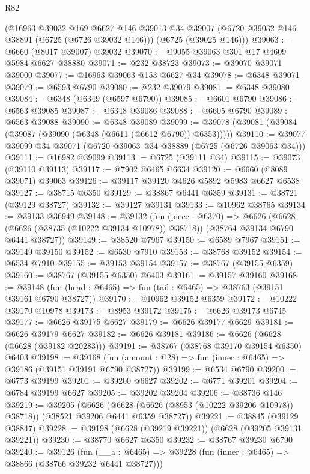 \begin{lexlean}{R82}
\begin{coremodule}
    (@16963
      @39032
      @169
      @6627
      @146
      @39013
      @34
      @39007
      (@6720 @39032 @146 @38891 (@6725 (@6726 @39032 @146)))
      (@6725 (@39025 @146)))
@39063 := @6660 (@8017 @39007) @39032
@39070 := @9055 @39063 @301 @17 @4609 @5984 @6627 @38880
@39071 := @232 @38723
@39073 := @39070 @39071 @39000
@39077 := @16963 @39063 @153 @6627 @34
@39078 := @6348 @39071
@39079 := @6593 @6790
@39080 := @232 @39079
@39081 := @6348 @39080
@39084 := @6348 (@6349 (@6597 @6790))
@39085 := @6601 @6790
@39086 := @6563 @39085
@39087 := @6348 @39086
@39088 := @6605 @6790
@39089 := @6563 @39088
@39090 := @6348 @39089
@39099 := @39078 (@39081 (@39084 (@39087 (@39090 (@6348 (@6611 (@6612 @6790)) @6353)))))
@39110 := @39077 @39099 @34 @39071 (@6720 @39063 @34 @38889 (@6725 (@6726 @39063 @34)))
@39111 := @16982 @39099
@39113 := @6725 (@39111 @34)
@39115 := @39073 (@39110 @39113)
@39117 := @7902 @6465 @6634
@39120 := @6660 (@8089 @39071) @39063
@39126 := @39117 @39120 @4626 @5892 @5983 @6627 @6538
@39127 := @38715 @6350
@39129 := @38867 @6441 @6359
@39131 := @38721 (@39129 @38727)
@39132 := @39127 @39131
@39133 := @10962 @38765
@39134 := @39133 @36949
@39148 := @39132
    (fun (piece : @6370) =>
    @6626 (@6628 (@6626 (@38735 (@10222 @39134 @10978)) @38718)) (@38764 @39134 @6790 @6441 @38727))
@39149 := @38520 @7967
@39150 := @6589 @7967
@39151 := @39149 @39150
@39152 := @6530 @7910
@39153 := @38768 @39152
@39154 := @6534 @7910
@39155 := @39153 @39154
@39157 := @38767 (@39155 @6359)
@39160 := @38767 (@39155 @6350) @6403
@39161 := @39157 @39160
@39168 := @39148 (fun (head : @6465) => fun (tail : @6465) => @38763 (@39151 @39161 @6790 @38727))
@39170 := @10962 @39152 @6359
@39172 := @10222 @39170 @10978
@39173 := @8953 @39172
@39175 := @6626 @39173 @6745
@39177 := @6626 @39175 @6627
@39179 := @6626 @39177 @6629
@39181 := @6626 @39179 @6627
@39182 := @6626 @39181
@39186 := @6626 (@6628 (@6628 (@39182 @20283)))
@39191 := @38767 (@38768 @39170 @39154 @6350) @6403
@39198 := @39168 (fun (amount : @28) => fun (inner : @6465) => @39186 (@39151 @39191 @6790 @38727))
@39199 := @6534 @6790
@39200 := @6773 @39199
@39201 := @39200 @6627
@39202 := @6771 @39201
@39204 := @6784 @39199 @6627
@39205 := @39202 @39204
@39206 := @38736 @146
@39219 := @39205
    (@6626 (@6628 (@6626 (@8953 (@10222 @39206 @10978)) @38718)) (@38521 @39206 @6441 @6359 @38727))
@39221 := @38845 (@39129 @38847)
@39228 := @39198 (@6628 (@39219 @39221)) (@6628 (@39205 @39131 @39221))
@39230 := @38770 @6627 @6350
@39232 := @38767 @39230 @6790
@39240 := @39126
    (fun (__a : @6465) => @39228 (fun (inner : @6465) => @38866 (@38766 @39232 @6441 @38727)))

\end{coremodule}
\end{lexlean}
